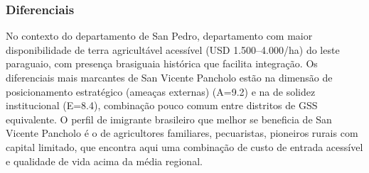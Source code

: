 \subsubsection*{Diferenciais}\label{dif-san-vicente-pancholo-0221}
No contexto do departamento de San Pedro, departamento com maior disponibilidade de terra agricultável acessível (USD 1.500–4.000/ha) do leste paraguaio, com presença brasiguaia histórica que facilita integração. Os diferenciais mais marcantes de San Vicente Pancholo estão na dimensão de posicionamento estratégico (ameaças externas) (A=9.2) e na de solidez institucional (E=8.4), combinação pouco comum entre distritos de GSS equivalente. O perfil de imigrante brasileiro que melhor se beneficia de San Vicente Pancholo é o de agricultores familiares, pecuaristas, pioneiros rurais com capital limitado, que encontra aqui uma combinação de custo de entrada acessível e qualidade de vida acima da média regional.
